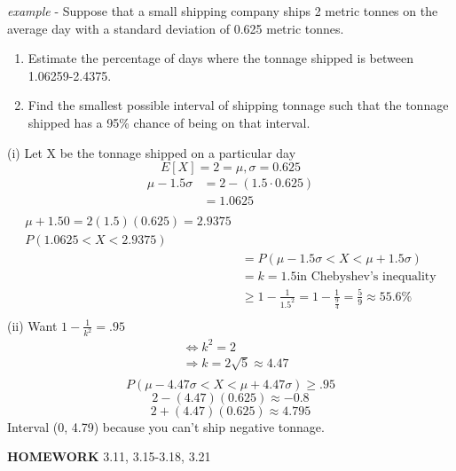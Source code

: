\documentclass[10pt,letterpaper]{report}
\begin{document}
\emph{example} - Suppose that a small shipping company ships 2 metric tonnes on the average day with a standard deviation of 0.625 metric tonnes.
\begin{enumerate}
\item Estimate the percentage of days where the tonnage shipped is between 1.06259-2.4375.
\item Find the smallest possible interval of shipping tonnage such that the tonnage shipped has a 95\% chance of being on that interval.
\end{enumerate}
(i) Let X be the tonnage shipped on a particular day
\[ E[X] = 2 = \mu, \sigma=0.625 \]
\begin{align*}
\mu -1.5\sigma & = 2-(1.5\cdot 0.625)\\
& =1.0625\\
\end{align*}
\begin{align*}
\mu +1.50 = 2(1.5)(0.625) = 2.9375\\
P(1.0625 < X < 2.9375)\\
& =P(\mu - 1.5\sigma < X < \mu +1.5\sigma)\\
& =k=1.5 \text{in Chebyshev's inequality}\\
& \geq 1-\frac{1}{1.5^2}=1-\frac{1}{\frac{9}{4}}=\frac{5}{9}\approx 55.6\%\\
\end{align*}
(ii) Want $1-\frac{1}{k^2}=.95$
\begin{align*}
& \Leftrightarrow k^2=2\\
& \Rightarrow k=2\sqrt{5} \approx 4.47\\
\end{align*}
\[ P(\mu -4.47\sigma < X < \mu +4.47\sigma) \geq .95 \]
\[2-(4.47)(0.625)\approx -0.8\]
\[2+(4.47)(0.625)\approx 4.795\]
Interval (0, 4.79) because you can't ship negative tonnage.

\textbf{HOMEWORK} 3.11, 3.15-3.18, 3.21
\end{document}
